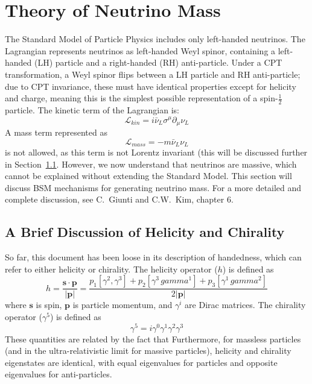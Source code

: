 \documentclass[/main.tex]{subfiles}
\begin{document}
\section{Theory of Neutrino Mass} \label{sec:numasstheory}
The Standard Model of Particle Physics includes only left-handed neutrinos.
The Lagrangian represents neutrinos as left-handed Weyl spinor, containing a left-handed (LH) particle and a right-handed (RH) anti-particle.
Under a CPT transformation, a Weyl spinor flips between a LH particle and RH anti-particle; due to CPT invariance, these must have identical properties except for helicity and charge, meaning this is the simplest possible representation of a spin-$\frac{1}{2}$ particle.
The kinetic term of the Lagrangian is:
\begin{equation}
  \mathcal{L}_{kin}= i\bar\nu_L\sigma^\mu\partial_\mu\nu_L
\end{equation}
A mass term represented as
\begin{equation}
  \mathcal{L}_{mass}=-m\bar\nu_L\nu_L
\end{equation}
is not allowed, as this term is not Lorentz invariant (this will be discussed further in Section~\ref{sec:helicitychirality}.
However, we now understand that neutrinos are massive, which cannot be explained without extending the Standard Model.
This section will discuss BSM mechanisms for generating neutrino mass.
For a more detailed and complete discussion, see C.~Giunti and C.W.~Kim, chapter 6\cite{Giunti}.

\subsection{A Brief Discussion of Helicity and Chirality} \label{sec:helicitychirality}
So far, this document has been loose in its description of handedness, which can refer to either helicity or chirality.
The helicity operator ($h$) is defined as
\begin{equation}
  h=\mathbf{\frac{s\cdot p}{|p|}}=\frac{p_1[\gamma^2,\gamma^3]+p_2[\gamma^3\,gamma^1]+p_3[\gamma^1\,gamma^2]}{2|\mathbf{p}|}
\end{equation}
where $\mathbf{s}$ is spin, $\mathbf{p}$ is particle momentum, and $\gamma^i$ are Dirac matrices.
The chirality operator ($\gamma^5$) is defined as 
\begin{equation}
  \gamma^5=i\gamma^0\gamma^1\gamma^2\gamma^3
\end{equation}
These quantities are related by the fact that
Furthermore, for massless particles (and in the ultra-relativistic limit for massive particles), helicity and chirality eigenstates are identical, with equal eigenvalues for particles and opposite eigenvalues for anti-particles.
\end{document}
